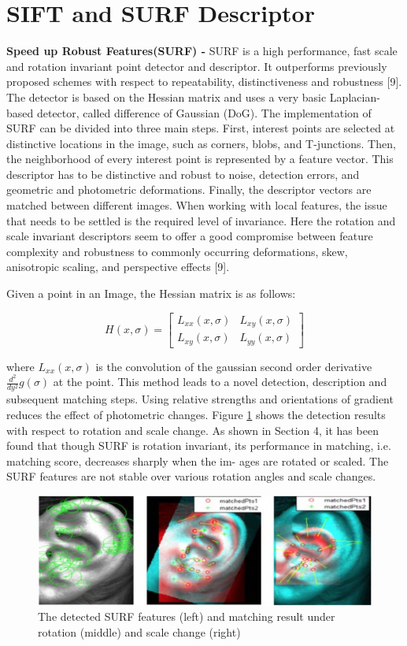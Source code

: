 \section{SIFT and SURF Descriptor}
\label{sec:build2}

\textbf{Speed up Robust Features(SURF) - } SURF is a high performance, fast scale and rotation invariant point detector and descriptor. It outperforms previously proposed schemes with respect to repeatability, distinctiveness and robustness [9]. The detector is based on the Hessian matrix and uses a very basic Laplacian-based detector, called difference of Gaussian (DoG). The implementation of SURF can be divided into three main steps. First, interest points are selected at distinctive locations in the image, such as corners, blobs, and T-junctions. Then, the neighborhood of every interest point is represented by a feature vector. This descriptor has to be distinctive and robust to noise, detection errors, and geometric and photometric deformations. Finally, the descriptor vectors are matched between different images. When working with local features, the issue that needs to be settled is the required level of invariance. Here the rotation and scale invariant descriptors seem to offer a good compromise between feature complexity and robustness to commonly occurring deformations, skew, anisotropic scaling, and perspective effects [9].

Given a point in an Image, the Hessian matrix is as follows:

\[
H(x,\sigma) =  
	\begin{bmatrix}
		L_{xx}(x,\sigma) &  L_{xy}(x,\sigma)\\
		L_{xy}(x,\sigma) &  L_{yy}(x,\sigma)
	\end{bmatrix}
\]

where $L_{xx}(x,\sigma)$ is the convolution of the gaussian second order derivative 
$\frac{d^2}{dy^2}g(\sigma)$ at the point. This method leads to a novel detection, description and subsequent matching steps. Using relative strengths and orientations of gradient reduces the effect of photometric changes. Figure \ref{fig:Figure9} shows the detection results with respect to rotation and scale change. As shown in Section 4, it has been found that though SURF is rotation invariant, its performance in matching, i.e. matching score, decreases sharply when the im- ages are rotated or scaled. The SURF features are not stable over various rotation angles and scale changes.
\\ 
\begin{figure}
	\includegraphics[width=\textwidth]{Figures/Figure9}
	\caption{The detected SURF features (left) and matching result under rotation (middle) and scale change (right)}
	\label{fig:Figure9}
\end{figure}

